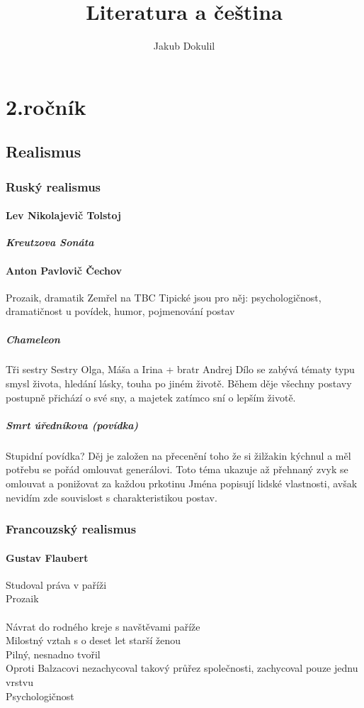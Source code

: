 \documentclass[10pt,a4page,headings,openany,%
oneside
,twocolumn
]{report}
\author{Jakub Dokulil}
\title{Literatura a čeština}
\begin{document}
\maketitle
\tableofcontents
\newpage
{}
\part{2.ročník}

\chapter{Realismus}

\pagestyle{headings}
\section{Ruský realismus}
\subsection{Lev Nikolajevič Tolstoj}
\textbf{\textit{Kreutzova Sonáta}}
\subsection{Anton Pavlovič Čechov}
Prozaik, dramatik
Zemřel na TBC
Tipické jsou pro něj: psychologičnost, dramatičnost u povídek, humor, pojmenování postav 
\subsubsection{Chameleon}
Tři sestry
Sestry Olga, Máša a Irina + bratr Andrej
Dílo se zabývá tématy typu smysl života, hledání lásky, touha po jiném životě. Během děje všechny postavy postupně přichází o své sny, a majetek zatímco sní o lepším životě.
\subsubsection{Smrt úředníkova (povídka)}
Stupidní povídka?
Děj je založen na přecenění toho že si žilžakin kýchnul a měl potřebu se pořád omlouvat generálovi.
Toto téma ukazuje až přehnaný zvyk se omlouvat a ponižovat za každou prkotinu
Jména popisují lidské vlastnosti, avšak nevidím zde souvislost s charakteristikou postav.
\section{Francouzský realismus}
\subsection{Gustav Flaubert}
Studoval práva v paříži\\
Prozaik\\
\\Návrat do rodného kreje s navštěvami paříže
\\Milostný vztah s o deset let starší ženou
\\Pilný, nesnadno tvořil
\\Oproti Balzacovi nezachycoval takový průřez společnosti, zachycoval pouze jednu vrstvu
\\Psychologičnost
\end{document}
